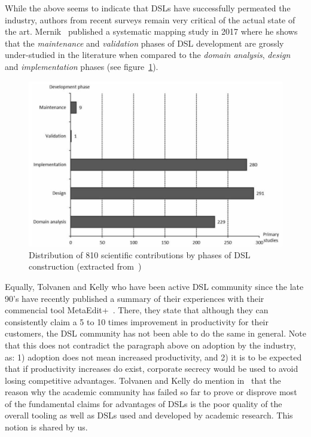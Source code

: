 \documentclass{scrartcl}
\begin{document}
While the above seems to indicate that DSLs have successfully permeated the
industry, authors from recent surveys remain very critical of the actual state
of the art. Mernik~\cite{Mernik17} published a systematic mapping study in
2017 where he shows that the \emph{maintenance} and \emph{validation} phases of
DSL development are grossly under-studied in the literature when compared to the
\emph{domain analysis}, \emph{design} and \emph{implementation} phases (see
figure~\ref{fig:DSL_design_phases}).

\begin{figure}[!h]
\centering 
\includegraphics[width=1\textwidth]{./figures/DSL_design_phases}
\caption{Distribution of 810 scientific contributions by phases of DSL
construction (extracted from~\cite{Mernik17})}
\label{fig:DSL_design_phases}
\end{figure}

Equally, Tolvanen and Kelly who have been active DSL community since the late
90's have recently published a summary of their experiences with their
commencial tool MetaEdit+~\cite{TolvanenKelly2016}. There, they state that
although they can consistently claim a 5 to 10 times improvement in productivity
for their customers, the DSL community has not been able to do the same in
general. Note that this does not contradict the paragraph above on adoption by
the industry, as: 1) adoption does not mean increased productivity, and 2) it is
to be expected that if productivity increases do exist, corporate secrecy would
be used to avoid losing competitive advantages. Tolvanen and Kelly do mention
in~\cite{TolvanenKelly2016} that the reason why the academic community has
failed so far to prove or disprove most of the fundamental claims for advantages
of DSLs is the poor quality of the overall tooling as well as DSLs used and
developed by academic research. This notion is shared by us.
\end{document}
